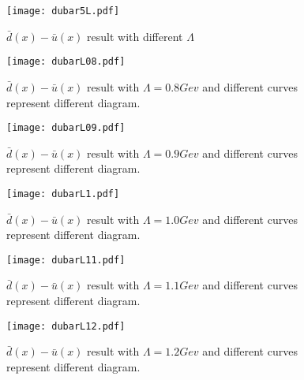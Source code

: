 \documentclass[preprintnumbers,prd,superscriptaddress,preprint]{revtex4-1}
\begin{document}
	\begin{figure}[h]
		\begin{center}
			\texttt{[image: dubar5L.pdf]}
			\caption{$\bar{d}(x)-\bar{u}(x)$ result with different $\Lambda$} 
			\label{5Lambda}
		\end{center}
	\end{figure}
	
	\begin{figure}[h]
		\begin{center}
			\texttt{[image: dubarL08.pdf]}
			\caption{$\bar{d}(x)-\bar{u}(x)$ result with $\Lambda=0.8Gev$ and different curves represent different diagram.} 
			\label{08Lambda}
		\end{center}
	\end{figure}
	
	\begin{figure}[h]
		\begin{center}
			\texttt{[image: dubarL09.pdf]}
			\caption{$\bar{d}(x)-\bar{u}(x)$ result with $\Lambda=0.9Gev$ and different curves represent different diagram.} 
			\label{09Lambda}
		\end{center}
	\end{figure}
	
	\begin{figure}[h]
		\begin{center}
			\texttt{[image: dubarL1.pdf]}
			\caption{$\bar{d}(x)-\bar{u}(x)$ result with $\Lambda=1.0Gev$ and different curves represent different diagram.} 
			\label{1Lambda}
		\end{center}
	\end{figure}
	
	\begin{figure}[h]
		\begin{center}
			\texttt{[image: dubarL11.pdf]}
			\caption{$\bar{d}(x)-\bar{u}(x)$ result with $\Lambda=1.1Gev$ and different curves represent different diagram.} 
			\label{11Lambda}
		\end{center}
	\end{figure}
	\begin{figure}[h]
		\begin{center}
			\texttt{[image: dubarL12.pdf]}
			\caption{$\bar{d}(x)-\bar{u}(x)$ result with $\Lambda=1.2Gev$ and different curves represent different diagram.} 
			\label{12Lambda}
		\end{center}
	\end{figure}
	
\end{document}

